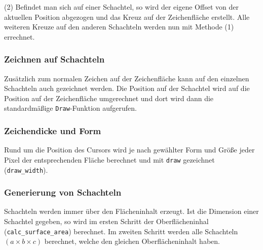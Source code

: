 (2) Befindet man sich auf einer Schachtel, so wird der eigene Offset von der aktuellen Position abgezogen und das Kreuz auf der Zeichenfläche erstellt. Alle weiteren Kreuze auf den anderen Schachteln werden nun mit Methode (1) errechnet.


\subsubsection{Zeichnen auf Schachteln}
\label{subsubsec:zeichnenaufbox}

Zusätzlich zum normalen Zeichen auf der Zeichenfläche kann auf den einzelnen Schachteln auch gezeichnet werden. Die Position auf der Schachtel wird auf die Position auf der Zeichenfläche umgerechnet und dort wird dann die standardmäßige \texttt{Draw}-Funktion aufgerufen.


\subsubsection{Zeichendicke und Form}
\label{subsubsec:zeichendickeForm}

Rund um die Position des Cursors wird je nach gewählter Form und Größe jeder Pixel der entsprechenden Fläche berechnet und mit \texttt{draw} gezeichnet (\texttt{draw\_width}).


\subsubsection{Generierung von Schachteln}
\label{subsubsec:generierungPreview}
Schachteln werden immer über den Flächeninhalt erzeugt. Ist die Dimension einer Schachtel gegeben, so wird im ersten Schritt der Oberflächeninhal (\texttt{calc\_surface\_area}) berechnet. Im zweiten Schritt werden alle Schachteln $(a\times b \times c)$ berechnet, welche den gleichen Oberflächeninhalt haben.\\


